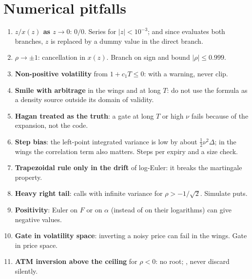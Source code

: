 \section{Numerical pitfalls}
\begin{enumerate}
\item \textbf{$z/x(z)$ as $z\to0$}: $0/0$. Series for $|z|<10^{-3}$; and since  evaluates both
branches, $z$ is replaced by a dummy value in the direct branch.
\item \textbf{$\rho\to\pm1$}: cancellation in $x(z)$. Branch on sign and bound $|\rho|\le0.999$.
\item \textbf{Non-positive volatility} from $1+c_1T\le0$:  with a warning, never clip.
\item \textbf{Smile with arbitrage} in the wings and at long $T$: do not use the formula as a density source outside
its domain of validity.
\item \textbf{Hagan treated as the truth}: a gate at long $T$ or high $\nu$ fails because of the expansion, not the
code.
\item \textbf{Step bias}: the left-point integrated variance is low by about $\tfrac12\nu^2\Delta$; in the wings the
correlation term also matters. Steps per expiry and a size check.
\item \textbf{Trapezoidal rule only in the drift} of log-Euler: it breaks the martingale property.
\item \textbf{Heavy right tail}: calls with infinite variance for $\rho>-1/\sqrt2$. Simulate puts.
\item \textbf{Positivity}: Euler on $F$ or on $\alpha$ (instead of on their logarithms) can give negative values.
\item \textbf{Gate in volatility space}: inverting a noisy price can fail in the wings. Gate in price space.
\item \textbf{ATM inversion above the ceiling} for $\rho<0$: no root; , never discard silently.
\end{enumerate}


